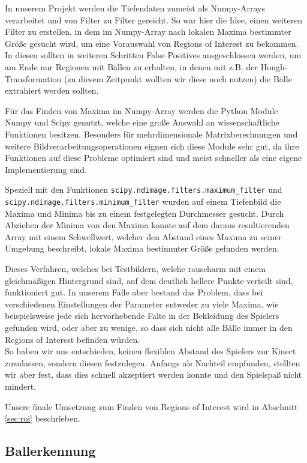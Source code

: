 \documentclass[12pt,a4paper,ngerman]{scrartcl}
\begin{document}
In unserem Projekt werden die Tiefendaten zumeist als Numpy-Arrays verarbeitet und von Filter zu Filter gereicht. So war hier die Idee, einen weiteren Filter zu erstellen, in dem im Numpy-Array nach lokalen Maxima bestimmter Größe gesucht wird, um eine Vorauswahl von Regions of Interest zu bekommen. In diesen sollten in weiteren Schritten False Positives ausgeschlossen werden, um am Ende nur Regionen mit Bällen zu erhalten, in denen mit z.B. der Hough-Transformation (zu diesem Zeitpunkt wollten wir diese noch nutzen) die Bälle extrahiert werden sollten.

Für das Finden von Maxima im Numpy-Array werden die Python Module Numpy\cite{numpy} und Scipy\cite{scipy} genutzt, welche eine große Auswahl an wissenschaftliche Funktionen besitzen. Besonders für mehrdimensionale Matrixberechnungen und weitere Bildverarbeitungsoperationen eignen sich diese Module sehr gut, da ihre Funktionen auf diese Probleme optimiert sind und meist schneller als eine eigene Implementierung sind.

Speziell mit den Funktionen {\tt scipy.ndimage.filters.maximum\_filter} und\\ {\tt scipy.ndimage.filters.minimum\_filter} wurden auf einem Tiefenbild die Maxima und Minima bis zu einem festgelegten Durchmesser gesucht. Durch Abziehen der Minima von den Maxima konnte auf dem daraus resultierenden Array mit einem Schwellwert, welcher den Abstand eines Maxima zu seiner Umgebung beschreibt, lokale Maxima bestimmter Größe gefunden werden.

Dieses Verfahren, welches bei Testbildern, welche rauscharm mit einem gleichmäßigen Hintergrund sind, auf dem deutlich hellere Punkte verteilt sind, funktioniert gut. In unserem Falle aber bestand das Problem, dass bei verschiedenen Einstellungen der Parameter entweder zu viele Maxima, wie beispielsweise jede sich hervorhebende Falte in der Bekleidung des Spielers gefunden wird, oder aber zu wenige, so dass sich nicht alle Bälle immer in den Regions of Interest befinden würden.\\
So haben wir uns entschieden, keinen flexiblen Abstand des Spielers zur Kinect zuzulassen, sondern diesen festzulegen. Anfangs als Nachteil empfunden, stellten wir aber fest, dass dies schnell akzeptiert werden konnte und den Spielspaß nicht mindert.

Unsere finale Umsetzung zum Finden von Regions of Interest wird in Abschnitt \ref{sec:roi} beschrieben.

\subsection{Ballerkennung}
\end{document}
